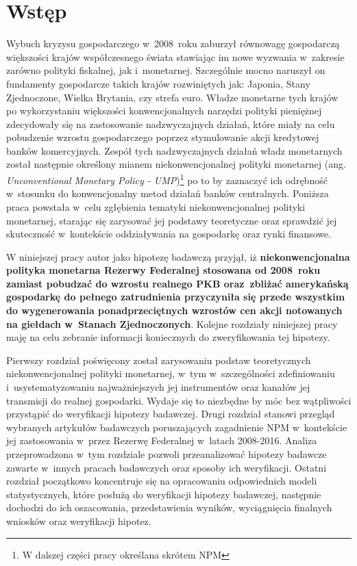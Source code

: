 \newpage
\chapter*{Wstęp}
 
Wybuch kryzysu gospodarczego w~2008~roku zaburzył równowagę gospodarczą większości krajów współczesnego świata stawiając im nowe wyzwania w~zakresie zarówno polityki fiskalnej, jak i~monetarnej. Szczególnie mocno naruszył on fundamenty gospodarcze takich krajów rozwiniętych jak: Japonia, Stany Zjednoczone, Wielka Brytania, czy strefa euro. Władze monetarne tych krajów po wykorzystaniu większości konwencjonalnych narzędzi polityki pieniężnej zdecydowały się na zastosowanie nadzwyczajnych działań, które miały na celu pobudzenie wzrostu gospodarczego poprzez stymulowanie akcji kredytowej banków komercyjnych. Zespół tych nadzwyczajnych działań władz monetarnych został następnie określony mianem niekonwencjonalnej polityki monetarnej (ang. \textit{Unconventional Monetary Policy - UMP})\footnote{W dalszej części pracy określana skrótem \acs{NPM}} po to by zaznaczyć ich odrębność w~stosunku do konwencjonalny metod działań banków centralnych. Poniższa praca powstała w~celu zgłębienia tematyki niekonwencjonalnej polityki monetarnej, starając się zarysować jej podstawy teoretyczne oraz sprawdzić jej skuteczność w~kontekście oddziaływania na gospodarkę oraz rynki finansowe.

W niniejszej pracy autor jako hipotezę badawczą przyjął, iż \textbf{niekonwencjonalna polityka monetarna Rezerwy Federalnej stosowana od 2008~roku zamiast pobudzać do wzrostu realnego \acs{PKB} oraz~zbliżać amerykańską gospodarkę do pełnego zatrudnienia przyczyniła się przede wszystkim do wygenerowania ponadprzeciętnych wzrostów cen akcji notowanych na giełdach w~Stanach Zjednoczonych}. Kolejne rozdziały niniejszej pracy maję na celu zebranie informacji koniecznych do zweryfikowania tej hipotezy.

Pierwszy rozdział poświęcony został zarysowaniu podstaw teoretycznych niekonwencjonalnej polityki monetarnej, w~tym w~szczególności zdefiniowaniu i~usystematyzowaniu najważniejszych jej instrumentów oraz kanałów jej transmisji do realnej gospodarki. Wydaje się to niezbędne by móc bez wątpliwości przystąpić do weryfikacji hipotezy badawczej. Drugi rozdział stanowi przegląd wybranych artykułów badawczych poruszających zagadnienie \acs{NPM} w~kontekście jej zastosowania w~przez Rezerwę Federalnej w~latach 2008-2016. Analiza przeprowadzona w~tym rozdziale pozwoli przeanalizować hipotezy badawcze zawarte w~innych pracach badawczych oraz sposoby ich weryfikacji. Ostatni rozdział początkowo koncentruje się na opracowaniu odpowiednich modeli statystycznych, które posłużą do weryfikacji hipotezy badawczej, następnie dochodzi do ich oszacowania, przedstawienia wyników, wyciągnięcia finalnych wniosków  oraz weryfikacji hipotez.

